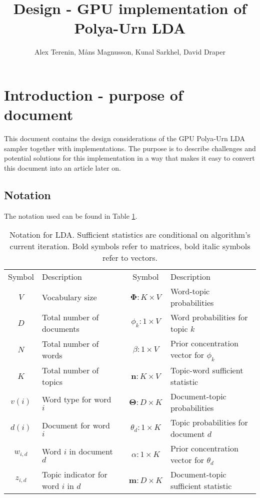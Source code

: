 \documentclass{article}
\title{Design - GPU implementation of Polya-Urn LDA}
\author{Alex Terenin, M{\aa}ns Magnusson, Kunal Sarkhel, David Draper}
\newcommand{\m}{\expandafter\mathbf} %
\begin{document}
\maketitle


\section{Introduction - purpose of document}

This document contains the design considerations of the GPU Polya-Urn LDA sampler together with implementations. The purpose is to describe challenges and potential solutions for this implementation in a way that makes it easy to convert this document into an article later on.

\subsection{Notation}

The notation used can be found in Table \ref{notation}.

\begin{table} 
\begin{center}
\small{
\begin{tabular}{c l c c l}
\hline
Symbol & Description && Symbol & Description
\\
\cline{1-2} \cline{4-5}
$V$ & Vocabulary size && $\m{\Phi} : K \times V$ & Word-topic probabilities
\\
$D$ & Total number of documents && $\phi_k : 1 \times V$ & Word probabilities for topic $k$
\\
$N$ & Total number of words && $\beta : 1 \times V$ & Prior concentration vector for $\phi_k$
\\
$K$ & Total number of topics && $\m{n} : K \times V$ & Topic-word sufficient statistic
\\
$v(i)$ & Word type for word $i$ && $\m{\Theta} : D \times K$ & Document-topic probabilities
\\
$d(i)$ & Document for word $i$ && $\theta_d : 1 \times K$ & Topic probabilities for document $d$
\\
$w_{i,d}$ & Word $i$ in document $d$ && $\alpha : 1 \times K$ & Prior concentration vector for $\theta_d$
\\
$z_{i,d}$ & Topic indicator for word $i$ in $d$ && $\m{m} : D \times K$ & Document-topic sufficient statistic
\\
\hline
\end{tabular}
}
\end{center}
\caption{Notation for LDA. Sufficient statistics are conditional on algorithm's current iteration. Bold symbols refer to matrices, bold italic symbols refer to vectors.}
\label{notation}
\end{table}
\end{document}
